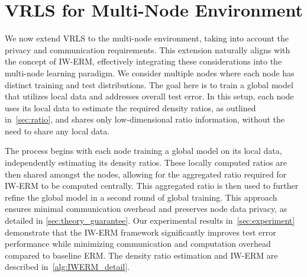 \section{VRLS for Multi-Node Environment}


We now extend VRLS to the multi-node environment, taking into account the privacy and communication requirements. 
This extension naturally aligns with the concept of IW-ERM, effectively integrating these considerations into the multi-node learning paradigm.
We consider multiple nodes where each node has distinct training and test distributions. The goal here is to train a global model that utilizes local data and addresses overall test error. In this setup, each node uses its local data to estimate the required density ratios, as outlined in~\cref{sec:ratio}, and shares only low-dimensional ratio information, without the need to share any local data.

The process begins with each node training a global model on its local data, independently estimating its density ratios. These locally computed ratios are then shared amongst the nodes, allowing for the aggregated ratio required for IW-ERM to be computed centrally. This aggregated ratio is then used to further refine the global model in a second round of global training. This approach ensures minimal communication overhead and preserves node data privacy, as detailed in \cref{sec:theory_guarantee}. Our experimental results in~\cref{sec:experiment} demonstrate that the IW-ERM framework significantly improves test error performance while minimizing communication and computation overhead compared to baseline ERM. The density ratio estimation and IW-ERM are described in~\cref{alg:IWERM_detail}.

